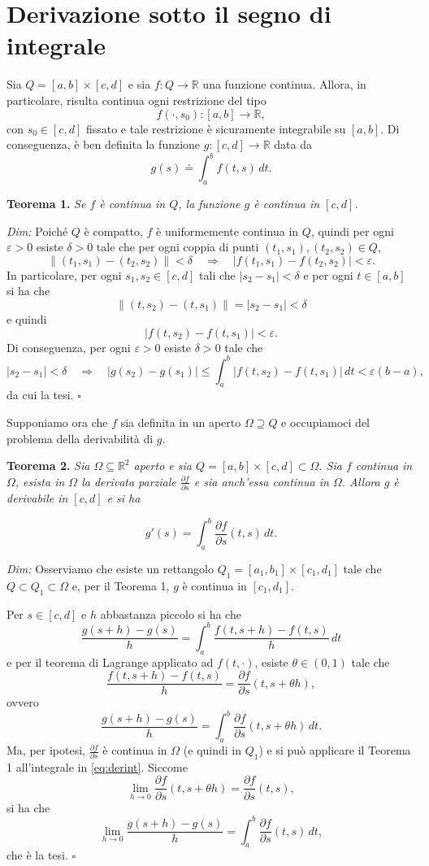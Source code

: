 \documentclass[11pt,a4paper]{article}
\newcommand{\R}{\mathbb{R}}
\newcommand{\result}[2]{\par\medskip\noindent\textbf{#1} \textit{#2}\par}
\newcommand{\proofit}{\par\medskip\noindent\textit{Dim:} }
\newcommand{\qedherecustom}{\hfill$\square$}
\begin{document}
\section{Derivazione sotto il segno di integrale}

Sia $Q=[a,b]\times[c,d]$ e sia $f:Q\to\R$ una funzione continua. Allora, in particolare, risulta continua ogni restrizione del tipo
\[
f(\cdot,s_0):[a,b]\to\R,
\]
con $s_0\in[c,d]$ fissato e tale restrizione è sicuramente integrabile su $[a,b]$. Di conseguenza, è ben definita la funzione $g:[c,d]\to\R$ data da
\[
g(s)\doteq\int_a^b f(t,s)\,dt.
\]

\result{Teorema 1.}{Se $f$ è continua in $Q$, la funzione $g$ è continua in $[c,d]$.}

\proofit Poiché $Q$ è compatto, $f$ è uniformemente continua in $Q$, quindi per ogni $\varepsilon>0$ esiste $\delta>0$ tale che per ogni coppia di punti $(t_1,s_1),(t_2,s_2)\in Q$,
\[
\lVert(t_1,s_1)-(t_2,s_2)\rVert<\delta
\quad\Longrightarrow\quad
|f(t_1,s_1)-f(t_2,s_2)|<\varepsilon.
\]
In particolare, per ogni $s_1,s_2\in[c,d]$ tali che $|s_2-s_1|<\delta$ e per ogni $t\in[a,b]$ si ha che
\[
\lVert(t,s_2)-(t,s_1)\rVert=|s_2-s_1|<\delta
\]
e quindi
\[
|f(t,s_2)-f(t,s_1)|<\varepsilon.
\]
Di conseguenza, per ogni $\varepsilon>0$ esiste $\delta>0$ tale che
\[
|s_2-s_1|<\delta
\quad\Longrightarrow\quad
|g(s_2)-g(s_1)|\leq\int_a^b|f(t,s_2)-f(t,s_1)|\,dt<\varepsilon(b-a),
\]
da cui la tesi. \qedherecustom

Supponiamo ora che $f$ sia definita in un aperto $\Omega\supseteq Q$ e occupiamoci del problema della derivabilità di $g$.

\result{Teorema 2.}{Sia $\Omega\subseteq\R^2$ aperto e sia $Q=[a,b]\times[c,d]\subset\Omega$. Sia $f$ continua in $\Omega$, esista in $\Omega$ la derivata parziale $\frac{\partial f}{\partial s}$ e sia anch'essa continua in $\Omega$. Allora $g$ è derivabile in $[c,d]$ e si ha}
\[
g'(s)=\int_a^b\frac{\partial f}{\partial s}(t,s)\,dt.
\]

\proofit Osserviamo che esiste un rettangolo $Q_1=[a_1,b_1]\times[c_1,d_1]$ tale che $Q\subset Q_1\subset\Omega$ e, per il Teorema 1, $g$ è continua in $[c_1,d_1]$.

Per $s\in[c,d]$ e $h$ abbastanza piccolo si ha che
\[
\frac{g(s+h)-g(s)}{h}
=\int_a^b\frac{f(t,s+h)-f(t,s)}{h}\,dt
\]
e per il teorema di Lagrange applicato ad $f(t,\cdot)$, esiste $\theta\in(0,1)$ tale che
\[
\frac{f(t,s+h)-f(t,s)}{h}
=\frac{\partial f}{\partial s}(t,s+\theta h),
\]
ovvero
\begin{equation}
\frac{g(s+h)-g(s)}{h}
=\int_a^b\frac{\partial f}{\partial s}(t,s+\theta h)\,dt.
\label{eq:derint}
\end{equation}
Ma, per ipotesi, $\frac{\partial f}{\partial s}$ è continua in $\Omega$ (e quindi in $Q_1$) e si può applicare il Teorema 1 all'integrale in \eqref{eq:derint}. Siccome
\[
\lim_{h\to0}\frac{\partial f}{\partial s}(t,s+\theta h)
=\frac{\partial f}{\partial s}(t,s),
\]
si ha che
\[
\lim_{h\to0}\frac{g(s+h)-g(s)}{h}
=\int_a^b\frac{\partial f}{\partial s}(t,s)\,dt,
\]
che è la tesi. \qedherecustom
\end{document}
